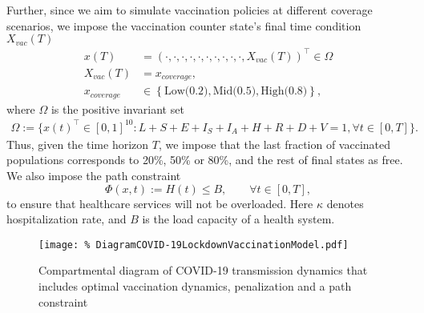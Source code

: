     Further, since we aim to simulate vaccination policies at different coverage
scenarios, we impose the vaccination counter state's final time condition
$X_{vac}(T)$
\begin{equation}
    \begin{aligned}
      x(T) &= 
        (
            \cdot, 
            \cdot, 
            \cdot, 
            \cdot, 
            \cdot, 
            \cdot, 
            \cdot, 
            \cdot, 
            \cdot, 
            \cdot,
        X_{vac }(T))^{\top}
      \in \Omega
      \\
      X_{vac}(T)
        &= x_{cover age},
      \\
      x_{coverage}
        & \in
        \left \{
          \text{Low(0.2)},\text{Mid(0.5)}, \text{High(0.8)}
        \right \},
    \end{aligned}
\end{equation}
%
where $\Omega$ is the positive invariant set
\begin{equation*}
    \begin{aligned}
        \Omega := 
            \Big \{
                x(t) ^{\top} \in [0,1]^{10}:
                L + S + E + I_S + I_A + H+ R + D + V = 1,
                \forall t \in [0, T]
            \Big \}.
    \end{aligned}
\end{equation*}
    Thus, given the time horizon $T$, we impose that the last fraction of
vaccinated populations corresponds to 20\%, 50\% or 80\%, and
the rest of final states as free. We also impose the path constraint
\begin{equation}
    \label{eqn:path_constrain}
    \Phi(x,t):= H(t) \leq B,
    \qquad \forall t \in [0, T],
\end{equation}
to ensure that healthcare services will not be overloaded. Here $\kappa$
denotes hospitalization rate, and $B$ is the load capacity of a
health system.

\begin{figure*}[tbh]
    \centering
        \texttt{[image: \%
        DiagramCOVID-19LockdownVaccinationModel.pdf]}
    \caption{
        Compartmental diagram of COVID-19 transmission dynamics that includes
        optimal vaccination dynamics, penalization and a path constraint
    }
    \label{fig:DiagramControl}
\end{figure*}


